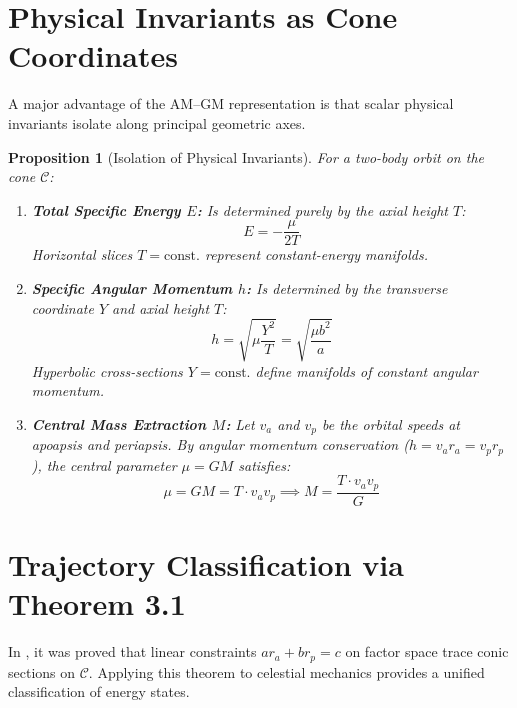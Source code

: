 \documentclass[11pt,3p,twocolumn]{elsarticle}
\newtheorem{proposition}[theorem]{Proposition}
\begin{document}
\section{Physical Invariants as Cone Coordinates}

A major advantage of the AM--GM representation is that scalar physical invariants isolate along principal geometric axes.

\begin{proposition}[Isolation of Physical Invariants]
For a two-body orbit on the cone $\mathcal{C}$:
\begin{enumerate}
    \item \textbf{Total Specific Energy $E$:} Is determined purely by the axial height $T$:
    \begin{equation}
    E = -\frac{\mu}{2T}
    \end{equation}
    Horizontal slices $T = \text{const.}$ represent constant-energy manifolds.
    
    \item \textbf{Specific Angular Momentum $h$:} Is determined by the transverse coordinate $Y$ and axial height $T$:
    \begin{equation}
    h = \sqrt{\mu \frac{Y^2}{T}} = \sqrt{\frac{\mu b^2}{a}}
    \end{equation}
    Hyperbolic cross-sections $Y = \text{const.}$ define manifolds of constant angular momentum.
    
    \item \textbf{Central Mass Extraction $M$:} Let $v_a$ and $v_p$ be the orbital speeds at apoapsis and periapsis. By angular momentum conservation ($h = v_a r_a = v_p r_p$), the central parameter $\mu = GM$ satisfies:
    \begin{equation}
    \mu = G M = T \cdot v_a v_p \implies M = \frac{T \cdot v_a v_p}{G}
    \end{equation}
\end{enumerate}
\end{proposition}

\section{Trajectory Classification via Theorem 3.1}

In \cite{Ebert2026}, it was proved that linear constraints $a r_a + b r_p = c$ on factor space trace conic sections on $\mathcal{C}$. Applying this theorem to celestial mechanics provides a unified classification of energy states.
\end{document}
